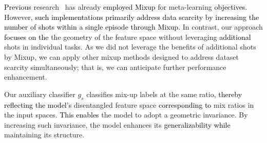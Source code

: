 \documentclass[letterpaper]{article} %
\newcommand{\nj}[1]{\textcolor{black}{#1}}
\newcommand{\jh}[1]{\textcolor{black}{#1}}
\newcommand{\yr}[1]{\textcolor{black}{#1}}
\begin{document}
\yr{Previous} research~\cite{scarcitylabel} has already \yr{employed Mixup} for meta-learning \yr{objectives}. However, \yr{such implementations primarily address data scarcity by increasing the number of shots within a single episode through Mixup.}
In contrast, our approach \yr{focuses on the} %
the geometry of the feature space without leveraging \yr{additional} %
shots in individual tasks. As we did not leverage the benefits of additional shots by Mixup, we can apply other mixup methods designed to address dataset scarcity simultaneously; that is, we can anticipate further performance enhancement. 
\begin{table}[t]
\centering
{}
\caption{Experiments on the number of output nodes $O$. A model was trained on the Mini-ImageNet dataset using an any-way training method, excluding the semantic classifier.}
\label{table:ablation}
\end{table}

Our auxiliary classifier $g_s$ classifies mix-up labels at the same ratio\yr{, thereby reflecting the model's} disentangled feature space \yr{corresponding to} mix ratios in the input spaces. \yr{This enables} the model to adopt a geometric invariance. By increasing such invariance, the model enhances its \nj{generalizability} \yr{while} maintaining its structure.
\end{document}
